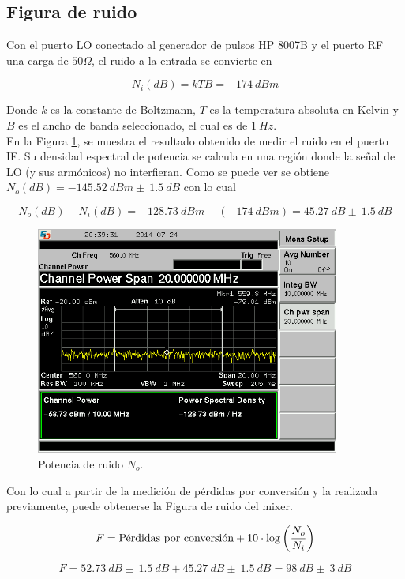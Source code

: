 \documentclass[a4paper,10pt]{article}
\begin{document}
	\subsection{Figura de ruido}
	\indent Con el puerto LO conectado al generador de pulsos HP 8007B y el 
	puerto RF una carga de $50\Omega$, el ruido a la entrada se convierte en 

	$$N_i(dB)=kTB=-174~dBm$$
		
	Donde $k$ es la constante de Boltzmann, $T$ es la temperatura absoluta en 
	Kelvin y $B$ es el ancho de banda seleccionado, el cual es de $1~Hz$. \\
	\indent En la Figura \ref{noise}, se muestra el resultado obtenido de medir 
	el ruido en el puerto IF. Su densidad espectral de potencia se calcula en 
	una regi\'on donde la se\~nal de LO (y sus arm\'onicos) no interfieran. Como
	se puede ver se obtiene $N_o(dB)=-145.52~dBm\pm~1.5~dB$ con lo cual
		
	$$N_o(dB)-N_i(dB)=-128.73~dBm-(-174~dBm)=45.27~dB\pm~1.5~dB$$			
	
	\begin{figure}[!htb]
		\centering
		\includegraphics[width=10cm]{Images/SCREN542.png}
		\caption{Potencia de ruido $N_o$.}
		\label{noise}
	\end{figure}
	
	\indent Con lo cual a partir de la medici\'on de p\'erdidas por conversi\'on
	y la realizada previamente, puede obtenerse la Figura de ruido del mixer.
	
	$$F=\textmd{P\'erdidas por conversi\'on}+10\cdot\log\left(\frac{N_o}{N_i}
	\right)$$
	
	$$F=52.73~dB\pm~1.5~dB+45.27~dB\pm~1.5~dB=98~dB\pm~3~dB$$
	
\end{document}
